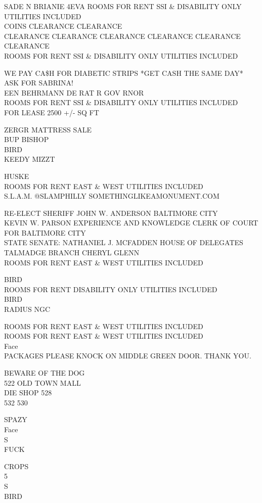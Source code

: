 \documentclass[10pt,letterpaper]{article}
\begin{document}
SADE N BRIANIE 4EVA ROOMS FOR RENT SSI \& DISABILITY ONLY UTILITIES INCLUDED\\
COINS CLEARANCE CLEARANCE\\
CLEARANCE CLEARANCE CLEARANCE CLEARANCE CLEARANCE CLEARANCE\\
ROOMS FOR RENT SSI \& DISABILITY ONLY UTILITIES INCLUDED

WE PAY CA\$H FOR DIABETIC STRIPS *GET CASH THE SAME DAY* ASK FOR SABRINA!\\
EEN BEHRMANN DE RAT R GOV RNOR\\
ROOMS FOR RENT SSI \& DISABILITY ONLY UTILITIES INCLUDED\\
FOR LEASE 2500 +/{-} SQ FT

ZERGR MATTRESS SALE\\
BUP BISHOP\\
BIRD\\
KEEDY MIZZT

HUSKE\\
ROOMS FOR RENT EAST \& WEST UTILITIES INCLUDED\\
S.L.A.M. @SLAMPHILLY SOMETHINGLIKEAMONUMENT.COM

RE{-}ELECT SHERIFF JOHN W. ANDERSON BALTIMORE CITY\\
KEVIN W. PARSON EXPERIENCE AND KNOWLEDGE CLERK OF COURT FOR BALTIMORE CITY\\
STATE SENATE: NATHANIEL J. MCFADDEN HOUSE OF DELEGATES TALMADGE BRANCH CHERYL GLENN\\
ROOMS FOR RENT EAST \& WEST UTILITIES INCLUDED

BIRD\\
ROOMS FOR RENT DISABILITY ONLY UTILITIES INCLUDED\\
BIRD\\
RADIUS NGC

ROOMS FOR RENT EAST \& WEST UTILITIES INCLUDED\\
ROOMS FOR RENT EAST \& WEST UTILITIES INCLUDED\\
Face\\
PACKAGES PLEASE KNOCK ON MIDDLE GREEN DOOR.  THANK YOU.

BEWARE OF THE DOG\\
522 OLD TOWN MALL\\
DIE SHOP 528\\
532 530

SPAZY\\
Face\\
S\\
FUCK

CROPS\\
5\\
S\\
BIRD
\end{document}
